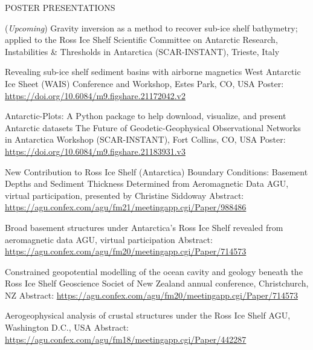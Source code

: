\documentclass{ExpressiveResume}
\begin{document}
\noindent POSTER PRESENTATIONS \newline
\begin{cventries}

    {(\textit{Upcoming}) Gravity inversion as a method to recover sub-ice shelf bathymetry; applied to the Ross Ice Shelf}
    {Scientific Committee on Antarctic Research, Instabilities \&
        Thresholds in Antarctica (SCAR-INSTANT), Trieste, Italy}
    {}
    {}




    {Revealing sub-ice shelf sediment basins with airborne magnetics}
    {West Antarctic Ice Sheet (WAIS) Conference and Workshop, Estes Park, CO, USA}
    {Poster: \url{https://doi.org/10.6084/m9.figshare.21172042.v2}}
    {}
    {}

    \talk{} %
    {Antarctic-Plots: A Python package to help download, visualize, and present Antarctic datasets}
    {The Future of Geodetic-Geophysical Observational Networks in
        Antarctica Workshop (SCAR-INSTANT), Fort Collins, CO, USA}
    {Poster: \url{https://doi.org/10.6084/m9.figshare.21183931.v3}}
    {}
    {}

    {New Contribution to Ross Ice Shelf (Antarctica) Boundary Conditions: Basement Depths and Sediment Thickness Determined from Aeromagnetic Data}
    {AGU, virtual participation, presented by Christine Siddoway}
    {Abstract: \url{https://agu.confex.com/agu/fm21/meetingapp.cgi/Paper/988486}}
    {}
    {}

    {Broad basement structures under Antarctica’s Ross Ice Shelf revealed from aeromagnetic data}
    {AGU, virtual participation}
    {Abstract: \url{https://agu.confex.com/agu/fm20/meetingapp.cgi/Paper/714573}}
    {}
    {}

    \talk{} %
    {Constrained geopotential modelling of the ocean cavity and geology beneath the Ross Ice Shelf}
    {Geoscience Societ of New Zealand annual conference, Christchurch, NZ}
    {Abstract: \url{https://agu.confex.com/agu/fm20/meetingapp.cgi/Paper/714573}}
    {}
    {}

    {Aerogeophysical analysis of crustal structures under the Ross Ice Shelf}
    {AGU, Washington D.C., USA}
    {Abstract: \url{https://agu.confex.com/agu/fm18/meetingapp.cgi/Paper/442287}}
    {}
    {}

\end{cventries}
\end{document}

